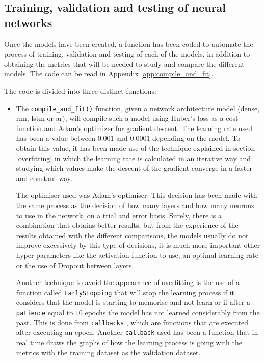 \subsection{Training, validation and testing of neural networks}


Once the models have been created, a function has been coded to automate the process of training, validation and testing of each of the models, in addition to obtaining the metrics that will be needed to study and compare the different models. The code can be read in Appendix \ref{app:compile_and_fit}.
\newline

The code is divided into three distinct functions:
\begin{itemize}
    \item The \small{\verb|compile_and_fit()|} \normalsize  function, given a network architecture model (dense, \acrshort{rnn}, \acrshort{lstm} or \acrshort{ar}), will compile such a model using Huber's loss as a cost function and Adam's optimizer for gradient descent. The learning rate used has been a value between $0.001$ and $0.0001$ depending on the model. To obtain this value, it has been made use of the technique explained in section \ref{overfitting} in which the learning rate is calculated in an iterative way and studying which values make the descent of the gradient converge in a faster and constant way.
    \newline
    
    The optimiser used was Adam's optimiser. This decision has been made with the same process as the decision of how many layers and how many neurons to use in the network, on a trial and error basis. Surely, there is a combination that obtains better results, but from the experience of the results obtained with the different comparisons, the models usually do not improve excessively by this type of decisions, it is much more important other hyper parameters like the activation function to use, an optimal learning rate or the use of Dropout between layers.
    \newline
    
    Another technique to avoid the appearance of overfitting is the use of a function called \small{\verb|EarlyStopping|} \normalsize  that will stop the learning process if it considers that the model is starting to memorise and not learn or if after a \small{\verb|patience|} \normalsize  equal to $10$ epochs the model has not learned considerably from the past. This is done from \small{\verb|callbacks|} \normalsize , which are functions that are executed after executing an epoch. Another \small{\verb|callback|} \normalsize  used has been a function that in real time draws the graphs of how the learning process is going with the metrics with the training dataset as the validation dataset.
    \newline
    

\end{itemize}
